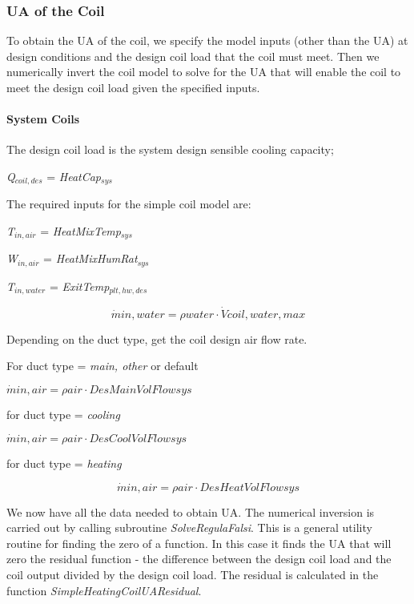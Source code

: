 \subsubsection{UA of the Coil}\label{ua-of-the-coil}

To obtain the UA of the coil, we specify the model inputs (other than the UA) at design conditions and the design coil load that the coil must meet. Then we numerically invert the coil model to solve for the UA that will enable the coil to meet the design coil load given the specified inputs.

\paragraph{System Coils}\label{system-coils-1}

The design coil load is the system design sensible cooling capacity;

\emph{Q\(_{coil,des}\)} = \emph{HeatCap\(_{sys}\)}

The required inputs for the simple coil model are:

\emph{T\(_{in,air}\)} = \emph{HeatMixTemp\(_{sys}\)}

\emph{W\(_{in,air}\)} = \emph{HeatMixHumRat\(_{sys}\)}

\emph{T\(_{in,water}\)} = \emph{ExitTemp\(_{plt,hw,des}\)}

\begin{equation}
\dot min,water = \rho water\cdot \dot Vcoil,water,max
\end{equation}

Depending on the duct type, get the coil design air flow rate.

For duct type = \emph{main, other} or default

\emph{\(\dot min,air = \rho air\cdot DesMainVolFlowsys\)}

for duct type = \emph{cooling}

\emph{\(\dot min,air = \rho air\cdot DesCoolVolFlowsys\)}

for duct type = \emph{heating}

\begin{equation}
\dot min,air = \rho air\cdot DesHeatVolFlowsys
\end{equation}

We now have all the data needed to obtain UA. The numerical inversion is carried out by calling subroutine \emph{SolveRegulaFalsi}. This is a general utility routine for finding the zero of a function. In this case it finds the UA that will zero the residual function - the difference between the design coil load and the coil output divided by the design coil load. The residual is calculated in the function \emph{SimpleHeatingCoilUAResidual}.

